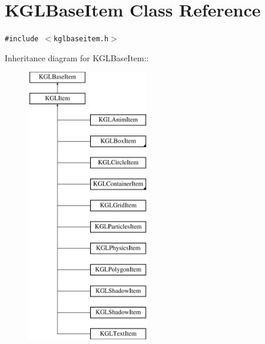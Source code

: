 \hypertarget{class_k_g_l_base_item}{
\section{KGLBaseItem Class Reference}
\label{class_k_g_l_base_item}
}
{\tt \#include $<$kglbaseitem.h$>$}

Inheritance diagram for KGLBaseItem::\begin{figure}[H]
\begin{center}
\leavevmode
\includegraphics[height=12cm]{class_k_g_l_base_item}
\end{center}
\end{figure}
